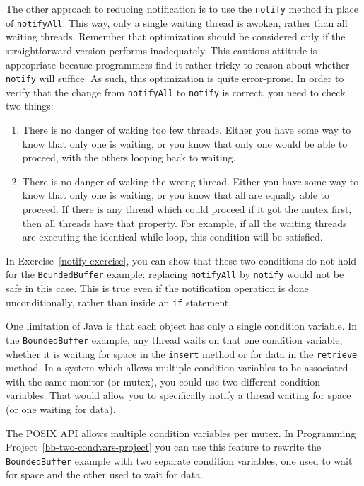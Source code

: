 The other approach to reducing notification is to use the
\verb|notify| method in place of \verb|notifyAll|.  This way, only a
single waiting thread is awoken, rather than all waiting threads.
Remember that optimization should be considered only if
the straightforward version performs inadequately.  This cautious
attitude is appropriate because programmers find it rather tricky to
reason about whether
\verb|notify| will suffice.  As such, this optimization is quite error-prone.
In
order to verify that the change from \verb|notifyAll| to \verb|notify|
is correct, you need to check two
things:
\begin{enumerate}
\item
There is no danger of waking too few threads.  Either you have some way
to know that only one is waiting, or you know that only one would be
able to proceed, with the others looping back to waiting.
\item
There is no danger of waking the wrong thread.  Either you have some
way to know that only one is waiting, or you know that all are equally
able to proceed.  If there is any thread which could proceed if it got
the mutex first, then all threads have that property.  For example, if
all the waiting threads are executing the identical while loop, this
condition will be satisfied.
\end{enumerate}
In
Exercise~\ref{notify-exercise}, you can show that these two conditions do not hold for the \verb|BoundedBuffer|
example: replacing \verb|notifyAll| by \verb|notify| would not be safe
in this case.  This is true even if the notification operation is
done unconditionally, rather than inside an \verb|if| statement.

One limitation of Java is that each object has only a single condition
variable.  In the \verb|BoundedBuffer| example, any thread waits on that one
condition variable, whether it is waiting for space in the
\verb|insert| method or for data in the \verb|retrieve| method.  In a
system which allows multiple condition variables to be associated with
the same monitor (or mutex), you could use two different condition
variables.  That would allow you to specifically notify a thread
waiting for space (or one waiting for data).

The POSIX API allows multiple condition variables per mutex.
In Programming Project~\ref{bb-two-condvars-project} you can use this
feature to rewrite the \verb|BoundedBuffer| example with
two separate condition variables, one used to wait for space and the
other used to wait for data.

